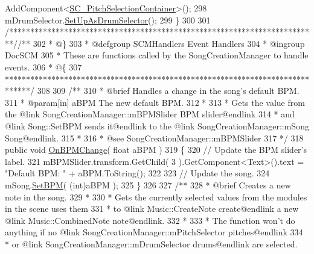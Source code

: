\begin{DoxyCodeInclude}
      AddComponent<\hyperlink{class_s_c___pitch_selection_container}{SC\_PitchSelectionContainer}>();
298         mDrumSelector.\hyperlink{group___s_c___p_s_c_pub_func_ga08a0a4943359eb7f28c64aaf4cbc233c}{SetUpAsDrumSelector}();
299     \}
300 
301     \textcolor{comment}{/*************************************************************************/}\textcolor{comment}{/** }
302 \textcolor{comment}{    * @\}}
303 \textcolor{comment}{    * @defgroup SCMHandlers Event Handlers}
304 \textcolor{comment}{    * @ingroup DocSCM}
305 \textcolor{comment}{    * These are functions called by the SongCreationManager to handle events.}
306 \textcolor{comment}{    * @\{}
307 \textcolor{comment}{    ******************************************************************************/}
308 \textcolor{comment}{}
309 \textcolor{comment}{    /**}
310 \textcolor{comment}{     * @brief Handles a change in the song's default BPM.}
311 \textcolor{comment}{     * @param[in] aBPM The new default BPM.}
312 \textcolor{comment}{     * }
313 \textcolor{comment}{     * Gets the value from the @link SongCreationManager::mBPMSlider BPM slider@endlink }
314 \textcolor{comment}{     * and @link Song::SetBPM sends it@endlink to the @link SongCreationManager::mSong Song@endlink.}
315 \textcolor{comment}{     * }
316 \textcolor{comment}{     * @see SongCreationManager::mBPMSlider}
317 \textcolor{comment}{    */}
318     \textcolor{keyword}{public} \textcolor{keywordtype}{void} \hyperlink{group___s_c_m_handlers_gae5930497314c77bd9c52c083b2f3e82e}{OnBPMChange}( \textcolor{keywordtype}{float} aBPM )
319     \{
320         \textcolor{comment}{// Update the BPM slider's label.}
321         mBPMSlider.transform.GetChild( 3 ).GetComponent<Text>().text = \textcolor{stringliteral}{"Default BPM: "} + aBPM.ToString();
322 
323         \textcolor{comment}{// Update the song.}
324         mSong.\hyperlink{group___song_pub_func_gaa65bbba1af7192edff7e0f848029013b}{SetBPM}( (\textcolor{keywordtype}{int})aBPM );
325     \}
326 \textcolor{comment}{}
327 \textcolor{comment}{    /**}
328 \textcolor{comment}{     * @brief Creates a new note in the song.}
329 \textcolor{comment}{     * }
330 \textcolor{comment}{     * Gets the currently selected values from the modules in the scene uses them}
331 \textcolor{comment}{     * to @link Music::CreateNote create@endlink a new @link Music::CombinedNote note@endlink.}
332 \textcolor{comment}{     * }
333 \textcolor{comment}{     * The function won't do anything if no @link SongCreationManager::mPitchSelector pitches@endlink}
334 \textcolor{comment}{     * or @link SongCreationManager::mDrumSelector drums@endlink are selected.}

\end{DoxyCodeInclude}

